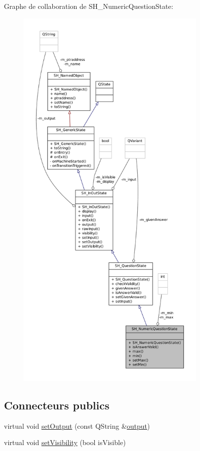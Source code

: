 Graphe de collaboration de S\-H\-\_\-\-Numeric\-Question\-State\-:\nopagebreak
\begin{figure}[H]
\begin{center}
\leavevmode
\includegraphics[height=550pt]{classSH__NumericQuestionState__coll__graph}
\end{center}
\end{figure}
\subsection*{Connecteurs publics}
\begin{DoxyCompactItemize}
\item 
virtual void \hyperlink{classSH__InOutState_a7dc244d72e09fdbc30eb3a704b05a4d8}{set\-Output} (const Q\-String \&\hyperlink{classSH__InOutState_a1a2fd4f34484125058e20730aaee7e46}{output})
\item 
virtual void \hyperlink{classSH__InOutState_a7706a2ea1367ab3416db27fa0f4794f7}{set\-Visibility} (bool is\-Visible)
\end{DoxyCompactItemize}
